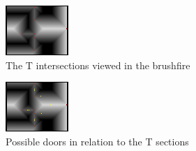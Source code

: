 \begin{figure}[ht]
\begin{subfigure}[t]{0.3\textwidth}
    \includegraphics[width = \textwidth]{graphics/door_intersection}
    \caption{The T intersections viewed in the brushfire}
    \label{intersections}
  \end{subfigure}
  \begin{subfigure}[t]{0.3\textwidth}
    \includegraphics[width = \textwidth]{graphics/possible_doors}
    \caption{Possible doors in relation to the T sections}
    \label{possible_doors}
  \end{subfigure}
  \begin{subfigure}[t]{0.3\textwidth}

\end{subfigure}
\end{figure}
